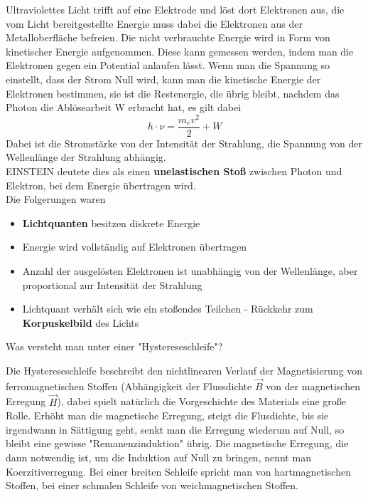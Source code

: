 \documentclass[12pt,a4paper,ngerman]{article}
\begin{document}
Ultraviolettes Licht trifft auf eine Elektrode und löst dort Elektronen aus, die vom Licht bereitgestellte Energie muss dabei die Elektronen aus der Metalloberfläche befreien. Die nicht verbrauchte Energie wird in Form von kinetischer Energie aufgenommen. Diese kann gemessen werden, indem man die Elektronen gegen ein Potential anlaufen lässt. Wenn man die Spannung so einstellt, dass der Strom Null wird, kann man die kinetische Energie der Elektronen bestimmen, sie ist die Restenergie, die übrig bleibt, nachdem das Photon die Ablösearbeit W erbracht hat, es gilt dabei
\begin{equation*}
h \cdot \nu = \frac{m_ev^2}{2} + W
\end{equation*}
Dabei ist die Stromstärke von der Intensität der Strahlung, die Spannung von der Wellenlänge der Strahlung abhängig. \\
EINSTEIN deutete dies als einen \textbf{unelastischen Stoß} zwischen Photon und Elektron, bei dem Energie übertragen wird. \\
Die Folgerungen waren
\begin{itemize}
\item \textbf{Lichtquanten} besitzen diskrete Energie
\item Energie wird vollständig auf Elektronen übertragen
\item Anzahl der ausgelösten Elektronen ist unabhängig von der Wellenlänge, aber proportional zur Intensität der Strahlung
\item Lichtquant verhält sich wie ein stoßendes Teilchen - Rückkehr zum \textbf{Korpuskelbild} des Lichts
\end{itemize}


\begin{framed}
Was versteht man unter einer "Hystereseschleife"?
\end{framed}
Die Hystereseschleife beschreibt den nichtlinearen Verlauf der Magnetisierung von ferromagnetischen Stoffen (Abhängigkeit der Flussdichte $\vec{B}$ von der magnetischen Erregung $\vec{H}$), dabei spielt natürlich die Vorgeschichte des Materials eine große Rolle. Erhöht man die magnetische Erregung, steigt die Flusdichte, bis sie irgendwann in Sättigung geht, senkt man die Erregung wiederum auf Null, so bleibt eine gewisse "Remanenzinduktion" übrig. Die magnetische Erregung, die dann notwendig ist, um die Induktion auf Null zu bringen, nennt man Koerzitiverregung. Bei einer breiten Schleife spricht man von hartmagnetischen Stoffen, bei einer schmalen Schleife von weichmagnetischen Stoffen. 
\end{document}

